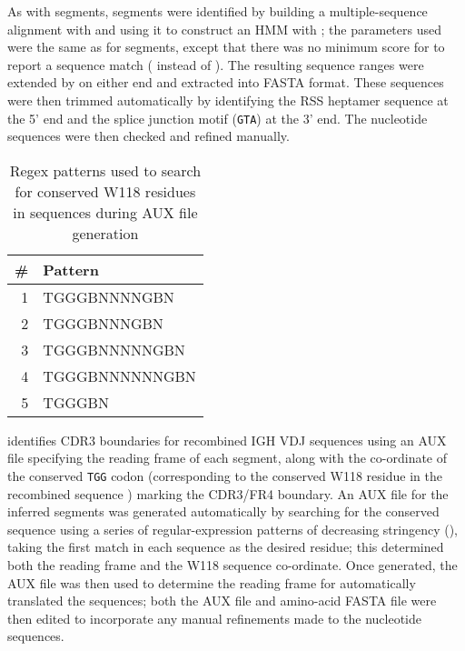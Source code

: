 \subsubsubsection{\jh}

As with \vh segments, \jh segments were identified by building a multiple-sequence alignment with  and using it to construct an HMM with ; the parameters used were the same as for \vh segments, except that there was no minimum score for  to report a sequence match ( instead of ). The resulting sequence ranges were extended by  on either end and extracted into FASTA format. These sequences were then trimmed automatically by identifying the RSS heptamer sequence at the 5' end and the splice junction motif (\texttt{GTA}) at the 3' end. The \jh nucleotide sequences were then checked and refined manually.

\begin{wraptable}{r}{5.5cm}
\caption{Regex patterns used to search for conserved W118 residues in \jh sequences during AUX file generation}\label{tab:jh-aux-patterns}
\begin{tabular}{r>{\ttseries}l}\toprule  
\# & Pattern \\\midrule
1 & TGGGBNNNNGBN\\
2 & TGGGBNNNGBN\\
3 & TGGGBNNNNNGBN\\
4 & TGGGBNNNNNNGBN\\
5 & TGGGBN\\\bottomrule
\end{tabular}
\end{wraptable}

 \parencite{ye2013igblast} identifies CDR3 boundaries for recombined IGH VDJ sequences using an AUX file specifying the reading frame of each \jh segment, along with the co-ordinate of the conserved \texttt{TGG} codon (corresponding to the conserved W118 residue in the recombined sequence \parencite{lefranc2014immunoglobulins}) marking the CDR3/FR4 boundary. An AUX file for the inferred \jh segments was generated automatically by searching for the conserved sequence using a series of regular-expression patterns of decreasing stringency (), taking the first match in each sequence as the desired residue; this determined both the reading frame and the W118 sequence co-ordinate. Once generated, the AUX file was then used to determine the reading frame for automatically translated the \jh sequences; both the AUX file and amino-acid FASTA file were then edited to incorporate any manual refinements made to the \jh nucleotide sequences.

